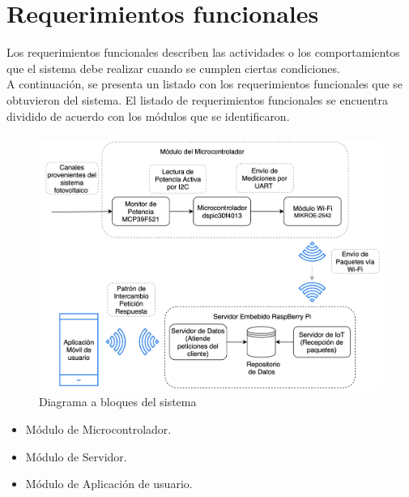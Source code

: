 \section{Requerimientos funcionales}
Los requerimientos funcionales describen las actividades o los comportamientos que el sistema debe realizar cuando se cumplen ciertas condiciones.
\\
A continuación, se presenta un listado con los requerimientos funcionales que se obtuvieron del sistema.
El listado de requerimientos funcionales se encuentra dividido de acuerdo con los módulos que se identificaron.

\paragraph{}
\begin{figure}[H]
	\centering
	\includegraphics[scale=.4]{Capitulo3/img/diagramabloques.png}
	\caption{Diagrama a bloques del sistema}
	\label{fig:diagrama_dispMonitoreo}
\end{figure}

\begin{itemize}
	\item Módulo de Microcontrolador.
	\item Módulo de Servidor.
	\item Módulo de Aplicación de usuario.
\end{itemize}

